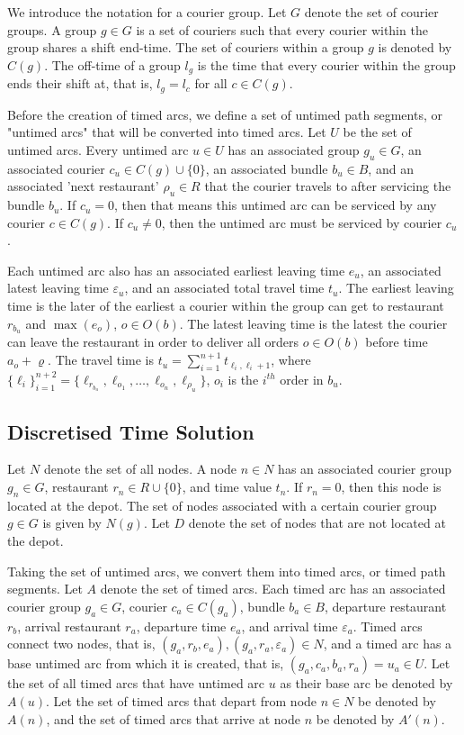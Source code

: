 \documentclass{article}
\begin{document}
We introduce the notation for a courier group. Let $G$ denote the set of courier groups. A group $g\in G$ is a set of couriers such that every courier within the group shares a shift end-time. The set of couriers within a group $g$ is denoted by $C(g)$. The off-time of a group $l_g$ is the time that every courier within the group ends their shift at, that is, $l_g=l_c$ for all $c\in C(g)$.

Before the creation of timed arcs, we define a set of untimed path segments, or "untimed arcs" that will be converted into timed arcs. Let $U$ be the set of untimed arcs. Every untimed arc $u\in U$ has an associated group $g_u\in G$, an associated courier $c_u\in C(g)\cup \{0\}$, an associated bundle $b_u\in B$, and an associated 'next restaurant' $\rho_u\in R$ that the courier travels to after servicing the bundle $b_u$. If $c_u=0$, then that means this untimed arc can be serviced by any courier $c\in C(g)$. If $c_u\neq 0$, then the untimed arc must be serviced by courier $c_u$. 

Each untimed arc also has an associated earliest leaving time $e_u$, an associated latest leaving time $\varepsilon_u$, and an associated total travel time $t_u$. The earliest leaving time is the later of the earliest a courier within the group can get to restaurant $r_{b_u}$ and $\max(e_o)$, $o\in O(b)$. The latest leaving time is the latest the courier can leave the restaurant in order to deliver all orders $o\in O(b)$ before time $a_o+\varrho$. The travel time is $t_u=\sum_{i=1}^{n+1}t_{\ell_i,\ell_i+1}$, where $\{\ell_i\}_{i=1}^{n+2}=\{\ell_{r_{b_u}}, \ell_{o_1}, \dots, \ell_{o_n}, \ell_{\rho_u}\}$, $o_i$ is the $i^{th}$ order in $b_u$.

\subsection{Discretised Time Solution}

Let $N$ denote the set of all nodes. A node $n\in N$ has an associated courier group $g_n\in G$, restaurant $r_n\in R\cup\{0\}$, and time value $t_n$. If $r_n=0$, then this node is located at the depot. The set of nodes associated with a certain courier group $g\in G$ is given by $N(g)$. Let $D$ denote the set of nodes that are not located at the depot.

Taking the set of untimed arcs, we convert them into timed arcs, or timed path segments. Let $A$ denote the set of timed arcs. Each timed arc has an associated courier group $g_a\in G$, courier $c_a\in C(g_a)$, bundle $b_a\in B$, departure restaurant $r_b$, arrival restaurant $r_a$, departure time $e_a$, and arrival time $\varepsilon_a$. Timed arcs connect two nodes, that is, $(g_a, r_b, e_a), (g_a, r_a, \varepsilon_a)\in N$, and a timed arc has a base untimed arc from which it is created, that is, $(g_a, c_a, b_a, r_a)=u_a\in U$. Let the set of all timed arcs that have untimed arc $u$ as their base arc be denoted by $A(u)$. Let the set of timed arcs that depart from node $n\in N$ be denoted by $A(n)$, and the set of timed arcs that arrive at node $n$ be denoted by $A'(n)$.
\end{document}

